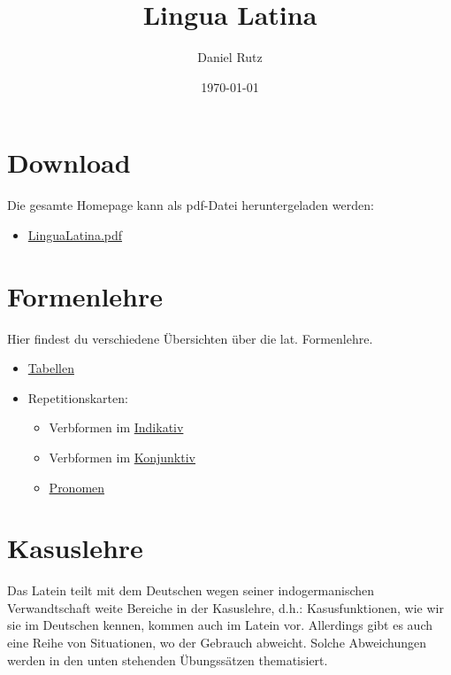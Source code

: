 \documentclass{scrartcl}
\author{Daniel Rutz}
\date{\today}
\title{Lingua Latina}
\begin{document}
\maketitle


\section{Download}
\label{sec:org1d89baf}
Die gesamte Homepage kann als pdf-Datei heruntergeladen werden:
\begin{itemize}
\item \href{https://www.dropbox.com/s/o6qan4c267z83ze/LinguaLatina.pdf?dl=0}{LinguaLatina.pdf}
\end{itemize}

\section{Formenlehre}
\label{sec:orga6936d0}
Hier findest du verschiedene Übersichten über die lat. 
Formenlehre.

\begin{itemize}
\item \href{https://www.dropbox.com/s/6mg0r0cdojb8uj4/GrammaticaLatina\_Formenlehre.pdf?dl=0}{Tabellen}
\item Repetitionskarten:
\begin{itemize}
\item Verbformen im \href{https://www.dropbox.com/s/nwnbpxhokzbotzx/RepetitionskartenFormellehreLateinIndikativ.pdf?dl=0}{Indikativ}
\item Verbformen im \href{https://www.dropbox.com/s/rew7e8ofvfnxeup/RepetitionskartenFormellehreLateinKonjunktiv.pdf?dl=0}{Konjunktiv}
\item \href{https://www.dropbox.com/s/pxnj7f8e4cacyuv/RepetitionskartenFormellehreLateinPronomina.pdf?dl=0}{Pronomen}
\end{itemize}
\end{itemize}

\section{Kasuslehre}
\label{sec:org73428b5}
Das Latein teilt mit dem Deutschen wegen seiner indogermanischen
Verwandtschaft weite Bereiche in der Kasuslehre, d.h.:
Kasusfunktionen, wie wir sie im Deutschen kennen, kommen auch im
Latein vor. Allerdings gibt es auch eine Reihe von Situationen, wo der
Gebrauch abweicht. Solche Abweichungen werden in den unten stehenden
Übungssätzen thematisiert. 
\end{document}
